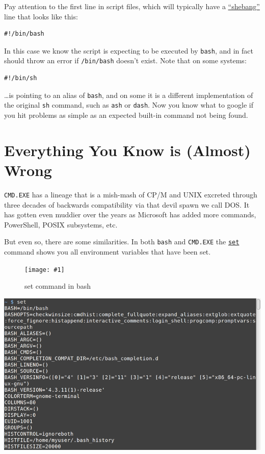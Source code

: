 \documentclass[10pt,]{book}
\numberwithin{figure}{chapter}
\DeclareRobustCommand{\icmd}[1]{\index{Commands!#1}}
\DeclareRobustCommand{\fimg}[3]{
\ifxetex
\begin{figure}[H]
\texttt{[image: \#1]}
\caption{#2}
\label{fig:#3}
\end{figure}
\fi}
\DeclareRobustCommand{\fref}[1]{\ifxetex{(Figure \ref{fig:#1})}\fi}
\begin{document}
Pay attention to the first line in script files, which will typically
have a
\href{https://en.wikipedia.org/wiki/Shebang_\%28Unix\%29}{``shebang''}
line that looks like this:

\begin{verbatim}
#!/bin/bash
\end{verbatim}

In this case we know the script is expecting to be executed by
\texttt{bash}, and in fact should throw an error if \texttt{/bin/bash}
doesn't exist. Note that on some systems:

\begin{verbatim}
#!/bin/sh
\end{verbatim}

\ldots{}is pointing to an alias of \texttt{bash}, and on some it is a
different implementation of the original \texttt{sh} command, such as
\texttt{ash} or \texttt{dash}. Now you know what to google if you hit
problems as simple as an expected built-in command not being found.

\section{Everything You Know is (Almost)
Wrong}\label{everything-you-know-is-almost-wrong}

\texttt{CMD.EXE} has a lineage that is a mish-mash of CP/M and UNIX
excreted through three decades of backwards compatibility via that devil
spawn we call DOS. It has gotten even muddier over the years as
Microsoft has added more commands, PowerShell, POSIX subsystems, etc.

But even so, there are some similarities. In both \texttt{bash}
\fref{set-command-in-bash} and \texttt{CMD.EXE}
\fref{set-command-in-cmd} the
\href{http://linux.die.net/man/1/set}{\texttt{set}} \icmd{set} command
shows you all environment variables that have been set.

\ifxetex\fimg{./images/set.png}{set command in bash}{set-command-in-bash}
\else
\includegraphics{./images/set.png} \fi
\end{document}
